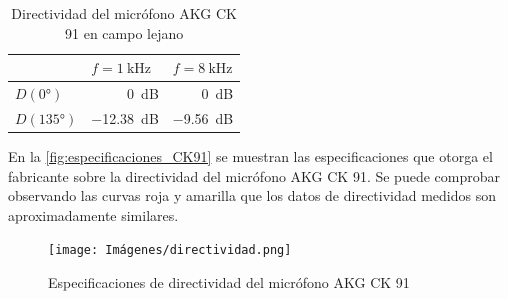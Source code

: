 \documentclass[10pt]{article}
\begin{document}
\begin{table}[htbp]
  \centering
  \caption{Directividad del micrófono AKG CK 91 en campo lejano}
  \begin{tabular}{|l|r|r|}
    \cline{2-3}    \multicolumn{1}{r}{} & \multicolumn{1}{|l|}{$f = \qty{1}{\kilo \hertz }$} & \multicolumn{1}{l|}{$f = \qty{8}{\kilo \hertz }$} \bigstrut \\
    \hline
    $D (\ang{0})$                       & \qty{0}{\dB}                                       & \qty{0}{\dB}  \bigstrut                                     \\
    \hline
    $D (\ang{135})$                     & \qty{-12.38}{\dB}                                  & \qty{-9.56}{\dB}  \bigstrut                                 \\
    \hline
  \end{tabular}%
  \label{tab:Directividad}%
\end{table}%

En la \autoref{fig:especificaciones_CK91} se muestran las especificaciones que otorga el fabricante sobre la directividad del micrófono AKG CK 91. Se puede comprobar observando las curvas roja y amarilla que los datos de directividad medidos son aproximadamente similares.

\begin{figure}[hbtp]
  \centering
  \texttt{[image: Imágenes/directividad.png]}
  \caption{Especificaciones de directividad del micrófono AKG CK 91}
  \label{fig:especificaciones_CK91}
\end{figure}

\newpage


\end{document}

